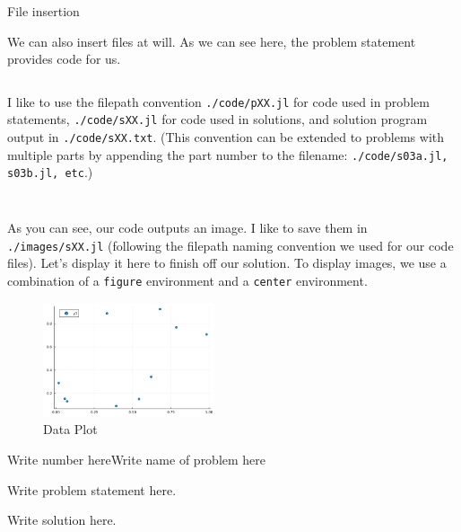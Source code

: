 \begin{hwkProblem}{3}{File insertion}

	We can also insert files at will. As we can see here, the problem statement provides code for us.
	\inputminted{julia}{./code/p03.jl}

	\hwkSol

	I like to use the filepath convention \texttt{./code/pXX.jl} for code used in problem statements, \texttt{./code/sXX.jl} for code used in solutions, and solution program output in \texttt{./code/sXX.txt}. (This convention can be extended to problems with multiple parts by appending the part number to the filename: \texttt{./code/{s03a.jl, s03b.jl, etc}}.)

	\inputminted{julia}{./code/s03.jl}
	\inputminted{julia}{./code/s03.txt}

	As you can see, our code outputs an image. I like to save them in \texttt{./images/sXX.jl} (following the filepath naming convention we used for our code files). Let's display it here to finish off our solution. To display images, we use a combination of a \texttt{figure} environment and a \texttt{center} environment.

	\begin{figure}[H]
		\begin{center}
			\includegraphics[width=0.45\textwidth]{./images/s03.png}
		\end{center}
		\caption{Data Plot}\label{fig:s03}
	\end{figure}

\end{hwkProblem}

\begin{hwkProblem}{Write number here}{Write name of problem here}

	Write problem statement here.

	\hwkSol{}

	Write solution here.

\end{hwkProblem}


